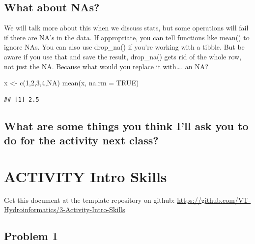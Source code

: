 \documentclass[
]{book}
\newenvironment{Shaded}{\begin{snugshade}}{\end{snugshade}}
\newcommand{\AttributeTok}[1]{\textcolor[rgb]{0.77,0.63,0.00}{#1}}
\newcommand{\ConstantTok}[1]{\textcolor[rgb]{0.00,0.00,0.00}{#1}}
\newcommand{\DecValTok}[1]{\textcolor[rgb]{0.00,0.00,0.81}{#1}}
\newcommand{\FunctionTok}[1]{\textcolor[rgb]{0.00,0.00,0.00}{#1}}
\newcommand{\NormalTok}[1]{#1}
\newcommand{\OtherTok}[1]{\textcolor[rgb]{0.56,0.35,0.01}{#1}}
\begin{document}
\hypertarget{what-about-nas}{%
\section{What about NAs?}\label{what-about-nas}}

We will talk more about this when we discuss stats, but some operations will fail if there are NA's in the data. If appropriate, you can tell functions like mean() to ignore NAs. You can also use drop\_na() if you're working with a tibble. But be aware if you use that and save the result, drop\_na() gets rid of the whole row, not just the NA. Because what would you replace it with\ldots. an NA?

\begin{Shaded}
\begin{Highlighting}[]
\NormalTok{x }\OtherTok{\textless{}{-}} \FunctionTok{c}\NormalTok{(}\DecValTok{1}\NormalTok{,}\DecValTok{2}\NormalTok{,}\DecValTok{3}\NormalTok{,}\DecValTok{4}\NormalTok{,}\ConstantTok{NA}\NormalTok{)}
\FunctionTok{mean}\NormalTok{(x, }\AttributeTok{na.rm =} \ConstantTok{TRUE}\NormalTok{)}
\end{Highlighting}
\end{Shaded}

\begin{verbatim}
## [1] 2.5
\end{verbatim}

\hypertarget{what-are-some-things-you-think-ill-ask-you-to-do-for-the-activity-next-class}{%
\section{What are some things you think I'll ask you to do for the activity next class?}\label{what-are-some-things-you-think-ill-ask-you-to-do-for-the-activity-next-class}}

\hypertarget{introactivity}{%
\chapter{ACTIVITY Intro Skills}\label{introactivity}}

Get this document at the template repository on github: \url{https://github.com/VT-Hydroinformatics/3-Activity-Intro-Skills}

\hypertarget{problem-1}{%
\section{Problem 1}\label{problem-1}}
\end{document}
